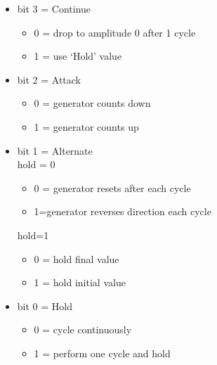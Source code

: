 \begin{itemize}
\item bit 3 = Continue
  \begin{itemize}
  \item 0 = drop to amplitude 0 after 1 cycle
  \item 1 = use ‘Hold’ value
  \end{itemize}
\item bit 2 = Attack
  \begin{itemize}
  \item 0 = generator counts down
  \item 1 = generator counts up
  \end{itemize}
\item bit 1 = Alternate\\
  hold = 0
  \begin{itemize}
  \item 0 = generator resets after each cycle
  \item 1=generator reverses direction each cycle
  \end{itemize}
  hold=1
  \begin{itemize}
  \item 0 = hold final value
  \item 1 = hold initial value
  \end{itemize}
\item bit 0 = Hold
  \begin{itemize}
  \item 0 = cycle continuously
  \item 1 = perform one cycle and hold
  \end{itemize}
\end{itemize}

